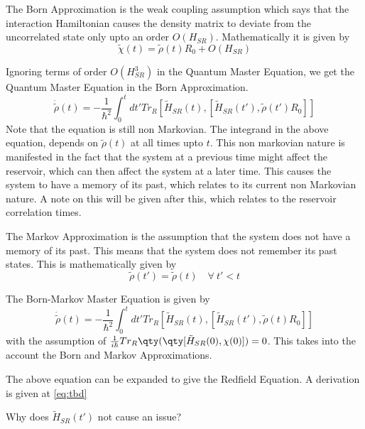 \documentclass{scrartcl}
\newcommand{\1}{\mathbbm{1}}
\newcommand{\ihsr}{\tilde{H}_{SR}}
\begin{document}
\begin{definition}
	The Born Approximation is the weak coupling assumption which says that the interaction Hamiltonian
	causes the density matrix to deviate from the uncorrelated state only upto an order $O(H_{SR})$.
	Mathematically it is given by
	\begin{equation}
		\tilde{\chi}(t) = \tilde{\rho}(t) R_0  + O(H_{SR})
	\end{equation}
\end{definition}
Ignoring terms of order $O(H_{SR}^3)$ in the Quantum Master Equation, we get the Quantum Master Equation in the Born Approximation.
\begin{equation}
	\dot{\tilde{\rho}}(t) = -\frac{1}{\hbar^2} \int_0^t dt' Tr_R[\tilde{H}_{SR}(t), [\tilde{H}_{SR}(t'), \tilde{\rho}(t')R_0]]
\end{equation}
Note that the equation is still non Markovian. The integrand in the above equation, depends on $\tilde{\rho}(t)$ at all times upto $t$.
This non markovian nature is manifested in the fact that the system at a previous time might affect the reservoir, which
can then affect the system at a later time. This causes the system to have a memory of its past, which relates to its current non Markovian nature.
A note on this will be given after this, which relates to the reservoir correlation times.
\begin{definition}
	The Markov Approximation is the assumption that the system does not have a memory of its past. This means that the system
	does not remember its past states. This is mathematically given by
	\begin{equation}
		\tilde{\rho}(t') = \tilde{\rho}(t) \quad \forall ~ t' < t
	\end{equation}

\end{definition}
\begin{definition}
	The Born-Markov Master Equation is given by
	\begin{equation}
		\dot{\tilde{\rho}}(t) = -\frac{1}{\hbar^2} \int_0^t dt' Tr_R[\tilde{H}_{SR}(t), [\tilde{H}_{SR}(t'), \tilde{\rho}(t)R_0]]
	\end{equation}
	with the assumption of $\frac{1}{i\hbar} Tr_R\qty(\qty[\tilde{H}_{SR}(0),\chi (0)]) = 0$. This takes into the account the
	Born and Markov Approximations.
\end{definition}
The above equation can be expanded to give the Redfield Equation. A derivation is given at \cref{eq:tbd}
\begin{remark}
	Why does $\ihsr (t')$ not cause an issue?
\end{remark}
\end{document}
